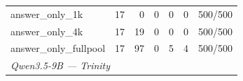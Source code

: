 \begin{table}[t]
{\begin{tabular}{lrrrrrr}
answer\_only\_1k & 17 & 0 & 0 & 0 & 0 & 500/500 \\
answer\_only\_4k & 17 & 19 & 0 & 0 & 0 & 500/500 \\
answer\_only\_fullpool & 17 & 97 & 0 & 5 & 4 & 500/500 \\
\midrule
\multicolumn{7}{l}{\textit{Qwen3.5-9B --- Trinity}} \\

\end{tabular}}
\end{table}
